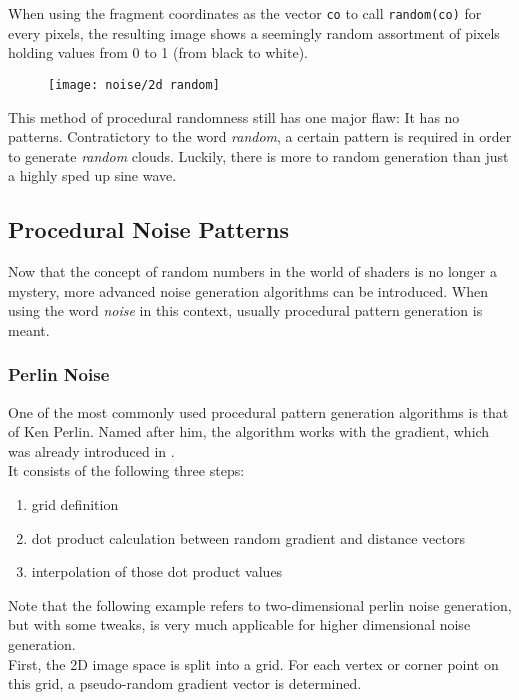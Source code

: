 \noindent
When using the fragment coordinates as the vector \lstinline[language=HLSL]{co} to call \lstinline[language=HLSL]{random(co)} for every pixels, the resulting image shows a seemingly random assortment of pixels holding values from 0 to 1 (from black to white).

\begin{figure}[H]
    \centering
            \texttt{[image: noise/2d random]}
            \label{img:noise:2d:random}
\end{figure}

\noindent
This method of \gls{procedural} randomness still has one major flaw: It has no patterns. Contratictory to the word \textit{random}, a certain pattern is required in order to generate \textit{random} clouds. Luckily, there is more to random generation than just a highly sped up sine wave.

\clearpage
\subsection{Procedural Noise Patterns}
Now that the concept of random numbers in the world of shaders is no longer a mystery, more advanced noise generation algorithms can be introduced.
When using the word \textit{\gls{noise}} in this context, usually \gls{procedural} pattern generation is meant.

\subsubsection{Perlin Noise}
One of the most commonly used \gls{procedural} pattern generation algorithms is that of Ken Perlin. Named after him, the algorithm works with the gradient, which was already introduced in .
\\
It consists of the following three steps: 
\begin{enumerate}
    \item grid definition
    \item dot product calculation between random gradient and distance vectors
    \item interpolation of those dot product values
\end{enumerate}

\noindent
Note that the following example refers to two-dimensional perlin noise generation, but with some tweaks, is very much applicable for higher dimensional noise generation.
\\
First, the 2D image space is split into a grid. For each vertex or corner point on this grid, a pseudo-random gradient vector is determined.

